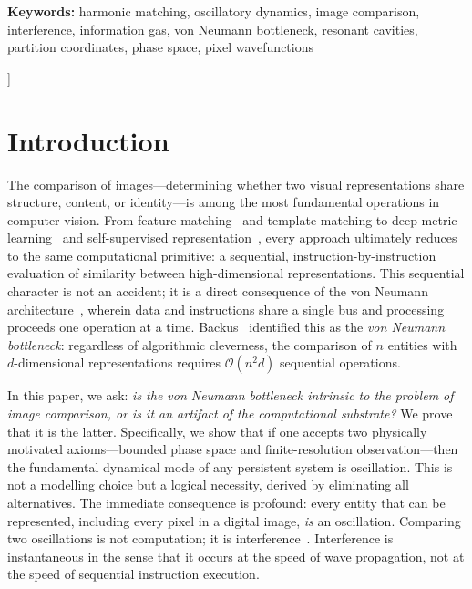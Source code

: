 \documentclass[11pt,twocolumn,a4paper]{article}
\newcommand{\BigO}{\mathcal{O}}
\begin{document}
\begin{@twocolumnfalse}
\begin{center}
\begin{minipage}{0.92\textwidth}
\vspace{8pt}

\textbf{Keywords:} harmonic matching, oscillatory dynamics, image comparison, interference, information gas, von Neumann bottleneck, resonant cavities, partition coordinates, phase space, pixel wavefunctions
\end{minipage}

\vspace{16pt}
\end{center}
\end{@twocolumnfalse}
]

\section{Introduction}\label{sec:introduction}

The comparison of images---determining whether two visual representations share structure, content, or identity---is among the most fundamental operations in computer vision. From feature matching~\citep{lowe2004} and template matching to deep metric learning~\citep{he2016} and self-supervised representation~\citep{oquab2024}, every approach ultimately reduces to the same computational primitive: a sequential, instruction-by-instruction evaluation of similarity between high-dimensional representations. This sequential character is not an accident; it is a direct consequence of the von Neumann architecture~\citep{vonneumann1945}, wherein data and instructions share a single bus and processing proceeds one operation at a time. Backus~\citep{backus1978} identified this as the \emph{von Neumann bottleneck}: regardless of algorithmic cleverness, the comparison of $n$ entities with $d$-dimensional representations requires $\BigO(n^2 d)$ sequential operations.

In this paper, we ask: \emph{is the von Neumann bottleneck intrinsic to the problem of image comparison, or is it an artifact of the computational substrate?} We prove that it is the latter. Specifically, we show that if one accepts two physically motivated axioms---bounded phase space and finite-resolution observation---then the fundamental dynamical mode of any persistent system is oscillation. This is not a modelling choice but a logical necessity, derived by eliminating all alternatives. The immediate consequence is profound: every entity that can be represented, including every pixel in a digital image, \emph{is} an oscillation. Comparing two oscillations is not computation; it is interference~\citep{young1802, born1999}. Interference is instantaneous in the sense that it occurs at the speed of wave propagation, not at the speed of sequential instruction execution.
\end{document}
